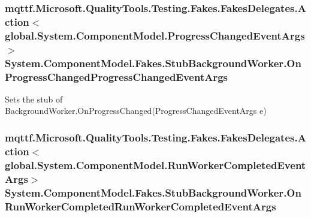 \hypertarget{class_system_1_1_component_model_1_1_fakes_1_1_stub_background_worker_afad859d58b9874fe82c3cb00f5d7cfba}{
\subsubsection[{On\-Progress\-Changed\-Progress\-Changed\-Event\-Args}]{\setlength{\rightskip}{0pt plus 5cm}mqttf.\-Microsoft.\-Quality\-Tools.\-Testing.\-Fakes.\-Fakes\-Delegates.\-Action$<$global.\-System.\-Component\-Model.\-Progress\-Changed\-Event\-Args$>$ System.\-Component\-Model.\-Fakes.\-Stub\-Background\-Worker.\-On\-Progress\-Changed\-Progress\-Changed\-Event\-Args}}\label{class_system_1_1_component_model_1_1_fakes_1_1_stub_background_worker_afad859d58b9874fe82c3cb00f5d7cfba}


Sets the stub of Background\-Worker.\-On\-Progress\-Changed(\-Progress\-Changed\-Event\-Args e)

\hypertarget{class_system_1_1_component_model_1_1_fakes_1_1_stub_background_worker_a2b543b8874a6f34729d202ca948785b9}{
\subsubsection[{On\-Run\-Worker\-Completed\-Run\-Worker\-Completed\-Event\-Args}]{\setlength{\rightskip}{0pt plus 5cm}mqttf.\-Microsoft.\-Quality\-Tools.\-Testing.\-Fakes.\-Fakes\-Delegates.\-Action$<$global.\-System.\-Component\-Model.\-Run\-Worker\-Completed\-Event\-Args$>$ System.\-Component\-Model.\-Fakes.\-Stub\-Background\-Worker.\-On\-Run\-Worker\-Completed\-Run\-Worker\-Completed\-Event\-Args}}\label{class_system_1_1_component_model_1_1_fakes_1_1_stub_background_worker_a2b543b8874a6f34729d202ca948785b9}



